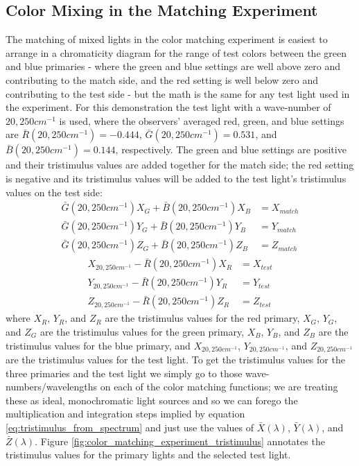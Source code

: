 \documentclass[twocolumn]{article}
\begin{document}
\subsection{Color Mixing in the Matching Experiment}
The matching of mixed lights in the color matching experiment is easiest to arrange in a chromaticity diagram for the range of test colors between the green and blue primaries - where the green and blue settings are well above zero and contributing to the match side, and the red setting is well below zero and contributing to the test side - but the math is the same for any test light used in the experiment.  For this demonstration the test light with a wave-number of $20,250cm^{-1}$ is used, where the observers' averaged red, green, and blue settings are $\bar{R}(20,250cm^{-1})=-0.444$, $\bar{G}(20,250cm^{-1})=0.531$, and $\bar{B}(20,250cm^{-1})=0.144$, respectively.  The green and blue settings are positive and their tristimulus values are added together for the match side; the red setting is negative and its tristimulus values will be added to the test light's tristimulus values on the test side:
\begin{equation}\label{eq:match_tristimulus}
    \begin{aligned}
        \bar{G}(20,250cm^{-1})X_G+\bar{B}(20,250cm^{-1})X_B&=X_{match}\\
        \bar{G}(20,250cm^{-1})Y_G+\bar{B}(20,250cm^{-1})Y_B&=Y_{match}\\
        \bar{G}(20,250cm^{-1})Z_G+\bar{B}(20,250cm^{-1})Z_B&=Z_{match}
    \end{aligned}
\end{equation}
\begin{equation}\label{eq:test_tristimulus}
    \begin{aligned}
        X_{20,250cm^{-1}}-\bar{R}(20,250cm^{-1})X_R&=X_{test}\\
        Y_{20,250cm^{-1}}-\bar{R}(20,250cm^{-1})Y_R&=Y_{test}\\
        Z_{20,250cm^{-1}}-\bar{R}(20,250cm^{-1})Z_R&=Z_{test}
    \end{aligned}
\end{equation}
where $X_R$, $Y_R$, and $Z_R$ are the tristimulus values for the red primary, $X_G$, $Y_G$, and $Z_G$ are the tristimulus values for the green primary, $X_B$, $Y_B$, and $Z_B$ are the tristimulus values for the blue primary, and $X_{20,250cm^{-1}}$, $Y_{20,250cm^{-1}}$, and $Z_{20,250cm^{-1}}$ are the tristimulus values for the test light.  To get the tristimulus values for the three primaries and the test light we simply go to those wave-numbers/wavelengths on each of the color matching functions; we are treating these as ideal, monochromatic light sources and so we can forego the multiplication and integration steps implied by equation \ref{eq:tristimulus_from_spectrum} and just use the values of $\bar{X}(\lambda)$, $\bar{Y}(\lambda)$, and $\bar{Z}(\lambda)$.  Figure \ref{fig:color_matching_experiment_tristimulus} annotates the tristimulus values for the primary lights and the selected test light.
\end{document}
